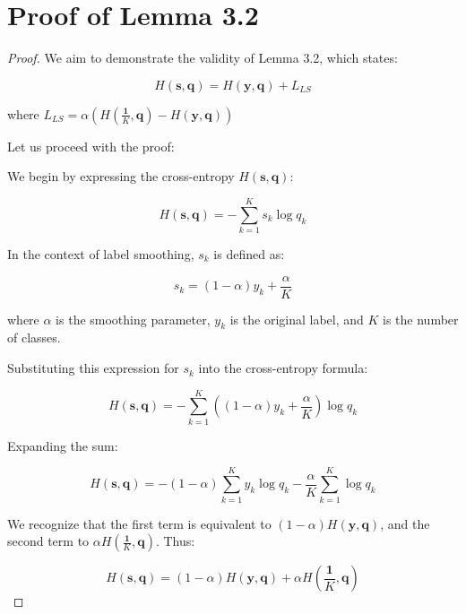 \section{Proof of Lemma 3.2}
\label{sec:proof_lem}

\begin{proof}
We aim to demonstrate the validity of Lemma 3.2, which states:

\begin{equation}
H(\mathbf{s}, \mathbf{q}) = H(\mathbf{y}, \mathbf{q}) + L_{LS}
\end{equation}

where $L_{LS} = \alpha\left(H\left(\frac{\mathbf{1}}{K}, \mathbf{q}\right) - H(\mathbf{y}, \mathbf{q})\right)$

Let us proceed with the proof:

We begin by expressing the cross-entropy $H(\mathbf{s}, \mathbf{q})$:

\begin{equation}
H(\mathbf{s}, \mathbf{q}) = -\sum_{k=1}^K s_k \log q_k
\end{equation}

In the context of label smoothing, $s_k$ is defined as:

\begin{equation}
s_k = (1-\alpha)y_k + \frac{\alpha}{K}
\end{equation}

where $\alpha$ is the smoothing parameter, $y_k$ is the original label, and $K$ is the number of classes.

Substituting this expression for $s_k$ into the cross-entropy formula:

\begin{equation}
H(\mathbf{s}, \mathbf{q}) = -\sum_{k=1}^K \left((1-\alpha)y_k + \frac{\alpha}{K}\right) \log q_k
\end{equation}

Expanding the sum:

\begin{equation}
H(\mathbf{s}, \mathbf{q}) = -(1-\alpha)\sum_{k=1}^K y_k \log q_k - \frac{\alpha}{K}\sum_{k=1}^K \log q_k
\end{equation}

We recognize that the first term is equivalent to $(1-\alpha)H(\mathbf{y}, \mathbf{q})$, and the second term to $\alpha H(\frac{\mathbf{1}}{K}, \mathbf{q})$. Thus:

\begin{equation}
H(\mathbf{s}, \mathbf{q}) = (1-\alpha)H(\mathbf{y}, \mathbf{q}) + \alpha H\left(\frac{\mathbf{1}}{K}, \mathbf{q}\right)
\end{equation}


\end{proof}
